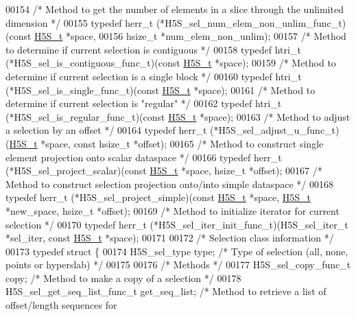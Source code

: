 \begin{DoxyCode}
00154 \textcolor{comment}{/* Method to get the number of elements in a slice through the unlimited dimension */}
00155 \textcolor{keyword}{typedef} herr\_t (*H5S\_sel\_num\_elem\_non\_unlim\_func\_t)(\textcolor{keyword}{const} \hyperlink{struct_h5_s__t}{H5S\_t} *space,
00156     hsize\_t *num\_elem\_non\_unlim);
00157 \textcolor{comment}{/* Method to determine if current selection is contiguous */}
00158 \textcolor{keyword}{typedef} htri\_t (*H5S\_sel\_is\_contiguous\_func\_t)(\textcolor{keyword}{const} \hyperlink{struct_h5_s__t}{H5S\_t} *space);
00159 \textcolor{comment}{/* Method to determine if current selection is a single block */}
00160 \textcolor{keyword}{typedef} htri\_t (*H5S\_sel\_is\_single\_func\_t)(\textcolor{keyword}{const} \hyperlink{struct_h5_s__t}{H5S\_t} *space);
00161 \textcolor{comment}{/* Method to determine if current selection is "regular" */}
00162 \textcolor{keyword}{typedef} htri\_t (*H5S\_sel\_is\_regular\_func\_t)(\textcolor{keyword}{const} \hyperlink{struct_h5_s__t}{H5S\_t} *space);
00163 \textcolor{comment}{/* Method to adjust a selection by an offset */}
00164 \textcolor{keyword}{typedef} herr\_t (*H5S\_sel\_adjust\_u\_func\_t)(\hyperlink{struct_h5_s__t}{H5S\_t} *space, \textcolor{keyword}{const} hsize\_t *offset);
00165 \textcolor{comment}{/* Method to construct single element projection onto scalar dataspace */}
00166 \textcolor{keyword}{typedef} herr\_t (*H5S\_sel\_project\_scalar)(\textcolor{keyword}{const} \hyperlink{struct_h5_s__t}{H5S\_t} *space, hsize\_t *offset);
00167 \textcolor{comment}{/* Method to construct selection projection onto/into simple dataspace */}
00168 \textcolor{keyword}{typedef} herr\_t (*H5S\_sel\_project\_simple)(\textcolor{keyword}{const} \hyperlink{struct_h5_s__t}{H5S\_t} *space, \hyperlink{struct_h5_s__t}{H5S\_t} *new\_space, hsize\_t *offset);
00169 \textcolor{comment}{/* Method to initialize iterator for current selection */}
00170 \textcolor{keyword}{typedef} herr\_t (*H5S\_sel\_iter\_init\_func\_t)(H5S\_sel\_iter\_t *sel\_iter, \textcolor{keyword}{const} \hyperlink{struct_h5_s__t}{H5S\_t} *space);
00171 
00172 \textcolor{comment}{/* Selection class information */}
00173 \textcolor{keyword}{typedef} \textcolor{keyword}{struct }\{
00174     H5S\_sel\_type type;                          \textcolor{comment}{/* Type of selection (all, none, points or hyperslab) */}
00175 
00176     \textcolor{comment}{/* Methods */}
00177     H5S\_sel\_copy\_func\_t copy;                   \textcolor{comment}{/* Method to make a copy of a selection */}
00178     H5S\_sel\_get\_seq\_list\_func\_t get\_seq\_list;   \textcolor{comment}{/* Method to retrieve a list of offset/length sequences for
}
\end{DoxyCode}
